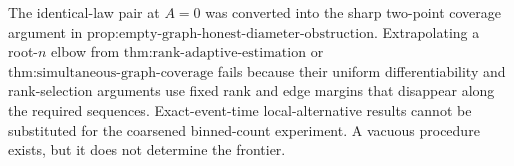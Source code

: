 The identical-law pair at \(A=0\) was converted into the sharp two-point coverage argument in \(\text{prop:empty-graph-honest-diameter-obstruction}\). Extrapolating a root-\(n\) elbow from \(\text{thm:rank-adaptive-estimation}\) or \(\text{thm:simultaneous-graph-coverage}\) fails because their uniform differentiability and rank-selection arguments use fixed rank and edge margins that disappear along the required sequences. Exact-event-time local-alternative results cannot be substituted for the coarsened binned-count experiment. A vacuous procedure exists, but it does not determine the frontier.